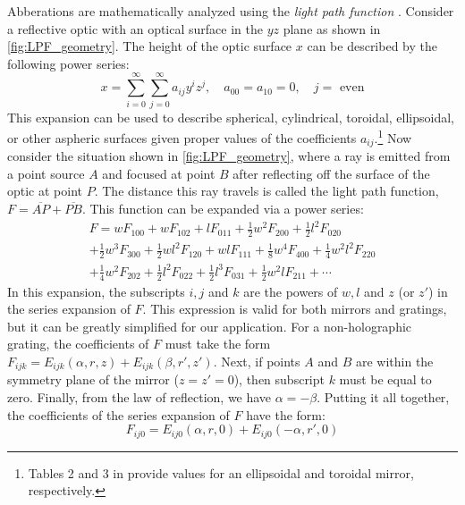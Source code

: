Abberations are mathematically analyzed using the \textit{light path function} \cite{nodaGeometricTheoryGrating1974,howellsMirrorsSynchrotronRadiationBeamlines1994,polettoMicrofocusingAttosecondPulses2013}. Consider a reflective optic with an optical surface in the $yz$ plane as shown in \cref{fig:LPF_geometry}. The height of the optic surface $x$ can be described by the following power series:
\begin{equation}
x = \sum_{i=0}^{\infty} \sum_{j=0}^{\infty} a_{ij} y^i z^j, \quad a_{00} = a_{10} = 0, \quad j = \textrm{ even}
\label{eqn:mirror_power_series}
\end{equation}
This expansion can be used to describe spherical, cylindrical, toroidal, ellipsoidal, or other aspheric surfaces given proper values of the coefficients $a_{ij}$.\footnote{Tables 2 and 3 in \cite{howellsMirrorsSynchrotronRadiationBeamlines1994} provide values for an ellipsoidal and toroidal mirror, respectively.} Now consider the situation shown in \cref{fig:LPF_geometry}, where a ray is emitted from a point source $A$ and focused at point $B$ after reflecting off the surface of the optic at point $P$. The distance this ray travels is called the light path function, $F = \overline{AP} + \overline{PB}$. 
This function can be expanded via a power series:
\begin{multline}
F = w F_{100} + w F_{102} + l F_{011} + \frac{1}{2} w^2 F_{200}+ \frac{1}{2} l^2 F_{020} \\
+ \frac{1}{2} w^3 F_{300} + \frac{1}{2} w l^2 F_{120} + w l F_{111} + \frac{1}{8} w^4 F_{400} + \frac{1}{4} w^2 l^2 F_{220} \\
+ \frac{1}{4} w^2 F_{202} + \frac{1}{2} l^2 F_{022} + \frac{1}{2} l^3 F_{031} + \frac{1}{2} w^2 l F_{211} + \cdots
\end{multline}
In this expansion, the subscripts $i, j$ and $k$ are the powers of $w, l$ and $z$ (or $z'$) in the series expansion of $F$. This expression is valid for both mirrors and gratings, but it can be greatly simplified for our application. For a non-holographic grating, the coefficients of $F$ must take the form $F_{ijk} = E_{ijk}(\alpha, r, z) + E_{ijk}(\beta, r', z')$. Next, if points $A$ and $B$ are within the symmetry plane of the mirror ($z=z'=0$), then subscript $k$ must be equal to zero. Finally, from the law of reflection, we have $\alpha = -\beta$. Putting it all together, the coefficients of the series expansion of $F$ have the form:
\begin{equation}
F_{ij0} = E_{ij0}(\alpha, r, 0) + E_{ij0}(-\alpha, r', 0)
\end{equation}

